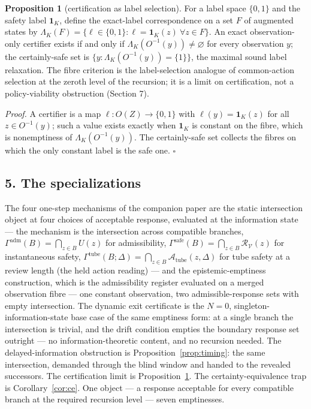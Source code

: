 \documentclass[10pt,twocolumn]{article}
\theoremstyle{definition}
\newtheorem{proposition}{Proposition}
\begin{document}
\begin{proposition}[certification as label selection]\label{prop:label}
For a label space \(\{0,1\}\) and the safety label
\(\mathbf{1}_{K}\), define the exact-label correspondence on a set \(F\) of
augmented states by
\(\Lambda_{K}(F) = \{ \ell \in \{0,1\} : \ell = \mathbf{1}_{K}(z)\ \forall z
\in F \}\). An exact observation-only certifier exists if and only if
\(\Lambda_{K}(O^{-1}(y)) \neq \varnothing\) for every observation \(y\); the
certainly-safe set is \(\{ y : \Lambda_{K}(O^{-1}(y)) = \{1\} \}\), the
maximal sound label relaxation. The fibre criterion is the label-selection
analogue of common-action selection at the zeroth level of the recursion;
it is a limit on certification, not a policy-viability obstruction
(Section 7).
\end{proposition}

\emph{Proof.} A certifier is a map \(\ell: O(Z) \to \{0,1\}\) with
\(\ell(y) = \mathbf{1}_{K}(z)\) for all \(z \in O^{-1}(y)\); such a value
exists exactly when \(\mathbf{1}_{K}\) is constant on the fibre, which is
nonemptiness of \(\Lambda_{K}(O^{-1}(y))\). The certainly-safe set collects
the fibres on which the only constant label is the safe one.
\hfill\(\square\)

\subsection{5. The specializations}\label{specializations}

The four one-step mechanisms of the companion paper are the static
intersection object at four choices of acceptable response, evaluated at
the information state --- the mechanism is the intersection across
compatible branches, \(\Gamma^{\mathrm{adm}}(B) = \bigcap_{z \in B} U(z)\)
for admissibility, \(\Gamma^{\mathrm{safe}}(B) = \bigcap_{z \in B}
\mathcal{R}_{\mathcal{V}}(z)\) for instantaneous safety,
\(\Gamma^{\mathrm{tube}}(B; \Delta) = \bigcap_{z \in B}
\mathcal{A}_{\mathrm{tube}}(z, \Delta)\) for tube safety at a review
length (the held action reading) --- and the epistemic-emptiness
construction, which is the admissibility register evaluated on a merged
observation fibre --- one constant observation, two admissible-response
sets with empty intersection. The dynamic exit certificate is the
\(N = 0\), singleton-information-state base case of the same emptiness
form: at a single branch the intersection is trivial, and the drift
condition empties the boundary response set outright --- no
information-theoretic content, and no recursion needed. The delayed-information
obstruction is Proposition~\ref{prop:timing}: the same intersection,
demanded through the blind window and handed to the revealed successors.
The certification limit is Proposition~\ref{prop:label}. The
certainty-equivalence trap is Corollary~\ref{cor:ce}. One object --- a
response acceptable for every compatible branch at the required recursion
level --- seven emptinesses.
\end{document}
